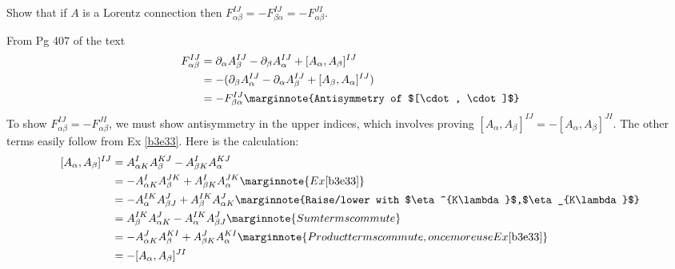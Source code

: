 \documentclass[10pt]{article}
\begin{document}
\begin{example}\label{b3e34}
	Show that if $A$ is a Lorentz connection then $F_{\alpha\beta}^{IJ}=-F_{\beta\alpha}^{IJ}=-F_{\alpha\beta}^{JI}$.
\end{example}
\sol From Pg 407 of the text
$$
\begin{aligned}
	F_{\alpha\beta}^{IJ} &= \partial_\alpha A_\beta^{IJ} - \partial_\beta A_\alpha^{IJ} + [A_\alpha, A_\beta]^{IJ}\\
	&= -(\partial_\beta A_\alpha^{IJ} - \partial_\alpha A_\beta^{IJ} + [A_\beta, A_\alpha]^{IJ})\\
	&= -F_{\beta\alpha}^{IJ}\marginnote{Antisymmetry of $[\cdot, \cdot]$}
\end{aligned}
$$
To show $F_{\alpha\beta}^{IJ}=-F_{\alpha\beta}^{JI}$, we must show antisymmetry in the upper indices, which involves proving $[A_\alpha, A_\beta]^{IJ}=-[A_\alpha, A_\beta]^{JI}$. The other terms easily follow from Ex \ref{b3e33}. Here is the calculation:
$$
\begin{aligned}
	[A_\alpha, A_\beta]^{IJ} &= A_{\alpha K}^I A_\beta^{KJ} - A_{\beta K}^I A_\alpha^{KJ}\\
	&= -A_{\alpha K}^I A_\beta^{JK} + A_{\beta K}^I A_\alpha^{JK}\marginnote{Ex \ref{b3e33}}\\
	&= -A_{\alpha}^{IK} A_{\beta J}^{J} + A_{\beta}^{IK} A_{\alpha K}^{J}\marginnote{Raise/lower with $\eta^{K\lambda}$,$\eta_{K\lambda}$}\\
	&= A_{\beta}^{IK} A_{\alpha K}^{J} -A_{\alpha}^{IK} A_{\beta J}^{J}\marginnote{Sum terms commute}\\
	&= -A_{\alpha K}^J A_\beta^{KI} + A_{\beta K}^J A_\alpha^{KI}\marginnote{Product terms commute, once more use Ex \ref{b3e33}}\\
	&= -[A_\alpha, A_\beta]^{JI}
\end{aligned}
$$
\end{document}
